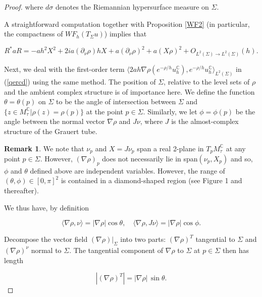 \documentclass[11pt,reqno]{amsart}
\newcommand{\C}{{\mathbb C}}
\theoremstyle{definition}
\newtheorem{remark}{Remark}
\begin{document}
\begin{proof}
where $d \sigma$ denotes the Riemannian hypersurface measure on $\Sigma.$ 


A straightforward computation together with  Proposition \ref{WF2} (in particular, the compactness of  $WF_h (T_{\Sigma} u)$) implies that



\begin{equation} \label{conjugation}
R^*aR=-ah^2X^2+2ia(\partial_{\nu}\rho)hX+a(\partial_{\nu}\rho)^2+a(X\rho)^2+O_{L^2(\Sigma)\to L^2(\Sigma)}(h).
\end{equation}



Next, we deal with the first-order term $\langle 2ah \nabla\rho(e^{-\rho/h}u_h^{\mathbb{C}}),e^{-\rho/h}u_h^{\mathbb{C}}\rangle_{L^2(\Sigma)}$ in (\ref{qercd}) using the same method. The position of $\Sigma$,  relative to the level sets of $\rho$ and the ambient complex structure is of importance here. We define the function $\theta=\theta(p)$ on $\Sigma$ to be the angle of intersection between $\Sigma$ and $\{z\in M_{\tau}^{\mathbb{C}}|\rho(z)=\rho(p)\}$ at the point $p\in \Sigma$. Similarly,  we let $\phi=\phi(p)$ be the angle between the normal vector $\nabla\rho$ and $J\nu$, where $J$ is the almost-complex structure of the Grauert tube.


\begin{remark} \label{plane}
We note that $\nu_p$ and $X = J \nu_p$ span a real 2-plane in $T_p M_\tau^\C$ at any point $p \in \Sigma$. However, $(\nabla \rho)_p$ does not necessarily lie in span$(\nu_p , X_p)$ and so, $\phi$ and $\theta$ defined above are independent variables. However, the range of $(\theta,\phi)\in [0,\pi]^2$ is contained in a diamond-shaped region (see Figure 1 and thereafter).
\end{remark} 

We thus have, by definition

\begin{equation}\label{theta,phi}
\langle\nabla\rho,\nu\rangle=|\nabla\rho|\cos\theta,\quad \langle \nabla\rho,J\nu\rangle=|\nabla \rho|\cos\phi.
\end{equation}

Decompose the vector field $(\nabla\rho)|_{\Sigma}$ into two parts: $(\nabla\rho)^{T}$ tangential to $\Sigma$ and $(\nabla\rho)^{\nu}$ normal to $\Sigma$. The tangential component of $\nabla \rho$ to $\Sigma$ at $p \in \Sigma$ then has length

\begin{equation} \label{tangential}
|(\nabla \rho)^{T} |= |\nabla \rho| \, \sin \theta.
\end{equation}


\end{proof}
\end{document}
